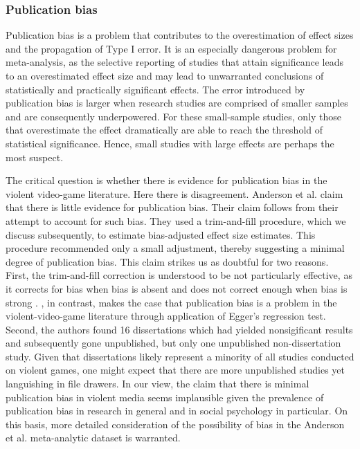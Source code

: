 \documentclass[man]{apa6}
\begin{document}
\subsubsection{Publication bias}
Publication bias is a problem that contributes to the overestimation of effect sizes and the propagation of Type I error. It is an especially dangerous problem for meta-analysis, as the selective reporting of studies that attain significance leads to an overestimated effect size and may lead to unwarranted conclusions of statistically and practically significant effects. The error introduced by publication bias is larger when research studies are comprised of smaller samples and are consequently underpowered.  For these small-sample studies, only those that overestimate the effect dramatically are able to reach the threshold of statistical significance. Hence, small studies with large effects are perhaps the most suspect.  

The critical question is whether there is evidence for publication bias in the violent video-game literature.  Here there is disagreement.  Anderson et al. claim that there is little evidence for publication bias.  Their claim follows from their attempt to account for such bias.  They used a  trim-and-fill procedure, which we discuss subsequently, to estimate bias-adjusted effect size estimates. This procedure recommended only a small adjustment, thereby suggesting a minimal degree of publication bias. This claim strikes us as doubtful for two reasons.  First, the trim-and-fill correction is understood to be not particularly effective, as it corrects for bias when bias is absent and does not correct enough when bias is strong \citep{Simonsohn:etal:2014b}. \citet{Ferguson:2007}, in contrast, makes the case that publication bias is a problem in the violent-video-game literature through application of Egger's regression test. Second, the authors found 16 dissertations which had yielded nonsigificant results and subsequently gone unpublished, but only one unpublished non-dissertation study. Given that dissertations likely represent a minority of all studies conducted on violent games, one might expect that there are more unpublished studies yet languishing in file drawers. In our view, the claim that there is minimal publication bias in violent media seems implausible given the prevalence of publication bias in research in general and in social psychology in particular.  On this basis, more detailed consideration of the possibility of bias in the Anderson et al. meta-analytic dataset is warranted.
\end{document}
